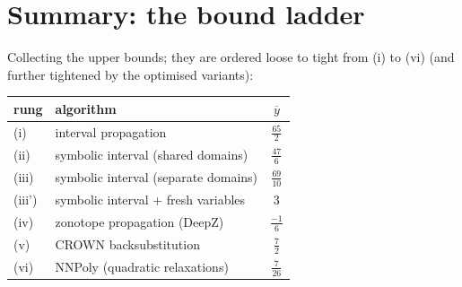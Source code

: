 \documentclass[11pt]{article}
\begin{document}
\section{Summary: the bound ladder}
Collecting the upper bounds; they are ordered loose to tight from (i) to (vi)
(and further tightened by the optimised variants):
\begin{table}[ht]\centering
\begin{tabular}{llc}\toprule
rung & algorithm & $\overline{y}$ \\
\midrule
(i) & interval propagation & $\frac{65}{2}$ \\
(ii) & symbolic interval (shared domains) & $\frac{47}{6}$ \\
(iii) & symbolic interval (separate domains) & $\frac{69}{10}$ \\
(iii') & symbolic interval + fresh variables & $3$ \\
(iv) & zonotope propagation (DeepZ) & $\frac{-1}{6}$ \\
(v) & CROWN backsubstitution & $\frac{7}{2}$ \\
(vi) & NNPoly (quadratic relaxations) & $\frac{7}{26}$ \\
\bottomrule
\end{tabular}
\end{table}
\end{document}
